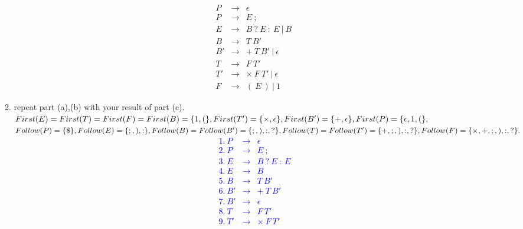 \documentclass[10pt]{exam}
\begin{document}
\begin{enumerate}
\begin{enumerate}
{\[\begin{array}{cll}
                      P  & \rightarrow & \epsilon                   \\
                      P  & \rightarrow & E \ ;                      \\
                      E  & \rightarrow & B \ ? \ E \ : \ E\ |\ B    \\
                      B  & \rightarrow & T\ B'                      \\
                      B' & \rightarrow & +\ T\ B'\ |\ \epsilon      \\
                      T  & \rightarrow & F\ T'                      \\
                      T' & \rightarrow & \times\ F\ T'\ |\ \epsilon \\
                      F  & \rightarrow & (\ E\ )\ |\ 1
                    \end{array}\]
                }
          \item repeat part (a),(b) with your result of part (c).\\
                \textcolor{blue}{
                  $First(E)=First(T)=First(F)=First(B)=\{1,(\},First(T')=\{\times, \epsilon\},\\First(B')=\{+,\epsilon\},First(P)=\{\epsilon,1,(\},$\\
                  $Follow(P)=\{\$\},Follow(E)=\{;,),:\},\\Follow(B)=Follow(B')=\{;,),:,?\},\\Follow(T)=Follow(T')=\{+,;,),:,?\},Follow(F)=\{\times,+,;,),:,?\}.$\\
                  \[\begin{array}{cll}
                      \ 1.\ P  & \rightarrow & \epsilon          \\
                      \ 2.\ P  & \rightarrow & E \ ;             \\
                      \ 3.\ E  & \rightarrow & B \ ? \ E \ : \ E \\
                      \ 4.\ E  & \rightarrow & B                 \\
                      \ 5.\ B  & \rightarrow & T\ B'             \\
                      \ 6.\ B' & \rightarrow & +\ T\ B'\         \\
                      \ 7.\ B' & \rightarrow & \epsilon          \\
                      \ 8.\ T  & \rightarrow & F\ T'             \\
                      \ 9.\ T' & \rightarrow & \times\ F\ T'     \\

\end{array}\]}
\end{enumerate}
\end{enumerate}
\end{document}
